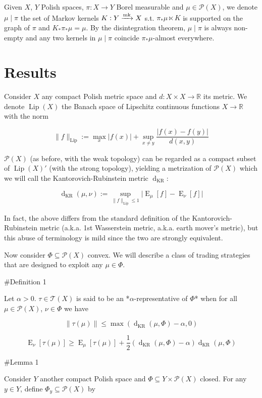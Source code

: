 \documentclass[a4paper]{article}
\DeclareMathOperator{\E}{E}
\newcommand{\Reals}{\mathbb{R}}
\newcommand{\Abs}[1]{\lvert #1 \rvert}
\newcommand{\Norm}[1]{\lVert #1 \rVert}
\newcommand{\Markov}{\xrightarrow{\textnormal{mk}}}
\newcommand{\Prob}{\mathcal{P}}
\newcommand{\T}{\mathcal{T}}
\newcommand{\Lip}{\operatorname{Lip}}
\newcommand{\NormL}[1]{\Norm{#1}_{\operatorname{Lip}}}
\newcommand{\Dkr}{\operatorname{d}_{\text{KR}}}
\begin{document}
Given ${X}$, ${Y}$ Polish spaces, ${\pi: X \rightarrow Y}$ Borel measurable and ${\mu \in \Prob(X)}$, we denote ${\mu \mid \pi}$ the set of Markov kernels ${K: Y \Markov X}$ s.t. ${\pi_* \mu \ltimes K}$ is supported on the graph of ${\pi}$ and ${K_*\pi_* \mu = \mu}$. By the disintegration theorem, ${\mu \mid \pi}$ is always non-empty and any two kernels in ${\mu \mid \pi}$ coincide ${\pi_*\mu}$-almost everywhere.

\section{Results}

Consider ${X}$ any compact Polish metric space and ${d: X \times X \rightarrow \Reals}$ its metric. We denote ${\Lip(X)}$ the Banach space of Lipschitz continuous functions ${X \rightarrow \Reals}$ with the norm

$$\NormL{f}:=\max_{x} \Abs{f(x)} + \sup_{x \ne y}\frac{\Abs{f(x)-f(y)}}{d(x,y)}$$

${\Prob(X)}$ (as before, with the weak topology) can be regarded as a compact subset of ${\Lip(X)'}$ (with the strong topology), yielding a metrization of ${\Prob(X)}$ which we will call the Kantorovich-Rubinstein metric ${\Dkr}$:

$$\Dkr(\mu,\nu):=\sup_{\NormL{f} \leq 1} \Abs{\E_\mu[f] - \E_\nu[f]}$$

In fact, the above differs from the standard definition of the Kantorovich-Rubinstein metric (a.k.a. 1st Wasserstein metric, a.k.a. earth mover's metric), but this abuse of terminology is mild since the two are strongly equivalent.

Now consider ${\Phi \subseteq \Prob(X)}$ convex. We will describe a class of trading strategies that are designed to exploit any ${\mu \in \Phi}$.

\#Definition 1

Let $\alpha > 0$. ${\tau \in \T(X)}$ is said to be an *$\alpha$-representative of $\Phi$* when for all ${\mu \in \Prob(X)}$, ${\nu \in \Phi}$ we have

$$\Norm{\tau(\mu)} \leq \max(\Dkr(\mu,\Phi) - \alpha, 0)$$

$$\E_\nu[\tau(\mu)] \geq \E_\mu[\tau(\mu)] + \frac{1}{2}(\Dkr(\mu,\Phi) - \alpha)\Dkr(\mu,\Phi)$$

\#Lemma 1

Consider ${Y}$ another compact Polish space and ${\Phi \subseteq Y \times \Prob(X)}$ closed. For any ${y \in Y}$, define ${\Phi_y \subseteq \Prob(X)}$ by
\end{document}
